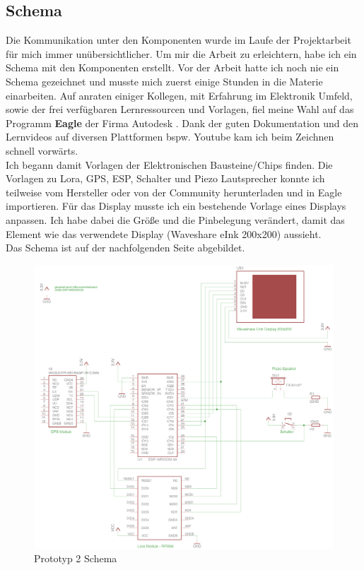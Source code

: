 \documentclass[11pt,english,german]{report}
\theoremstyle{definition}
\begin{document}
\subsection{Schema}
Die Kommunikation unter den Komponenten wurde im Laufe der Projektarbeit  für mich immer unübersichtlicher. Um mir die Arbeit zu erleichtern, habe ich ein Schema mit den Komponenten erstellt. Vor der Arbeit hatte ich noch nie ein Schema gezeichnet und musste mich zuerst einige Stunden in die Materie einarbeiten. Auf anraten einiger Kollegen, mit Erfahrung im Elektronik Umfeld, sowie der frei verfügbaren Lernressourcen und Vorlagen, fiel meine Wahl auf das Programm \textbf{Eagle} der Firma Autodesk \cite{autodesk}. Dank der guten Dokumentation und den Lernvideos auf diversen Plattformen bspw. Youtube kam ich beim Zeichnen schnell vorwärts. \\[0.3cm] 
Ich begann damit Vorlagen der Elektronischen Bausteine/Chips finden. Die Vorlagen zu Lora, GPS, ESP, Schalter und Piezo Lautsprecher konnte ich teilweise vom Hersteller oder von der Community herunterladen und in Eagle importieren. Für das Display musste ich ein bestehende Vorlage eines Displays anpassen. Ich habe dabei die Größe und die Pinbelegung verändert, damit das Element wie das verwendete Display (Waveshare eInk 200x200) aussieht. \\[0.3cm]
Das Schema ist auf der nachfolgenden Seite abgebildet.
\newpage

\begin{figure}[H]
	\centering
	\includegraphics[width=\textwidth]{img/prototyp_schema.png}
	\caption[Prototyp2 Schema]
	{Prototyp 2 Schema}
\end{figure}
\end{document}
